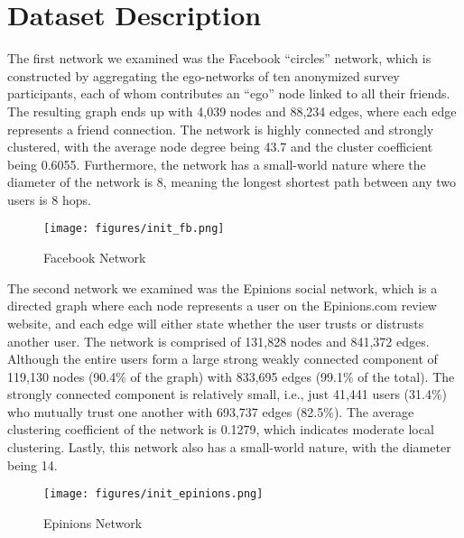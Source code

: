 \section{Dataset Description}

The first network we examined was the Facebook “circles” network, which is constructed by aggregating the ego-networks of ten anonymized survey participants, each of whom contributes an “ego” node linked to all their friends. The resulting graph ends up with 4,039 nodes and 88,234 edges, where each edge represents a friend connection. The network is highly connected and strongly clustered, with the average node degree being 43.7 and the cluster coefficient being 0.6055. Furthermore, the network has a small-world nature where the diameter of the network is 8, meaning the longest shortest path between any two users is 8 hops. 

\begin{figure}[ht]
    \centering
    \texttt{[image: figures/init\_fb.png]}
    \caption{Facebook Network}
    \label{fig:enter-label}
\end{figure}

The second network we examined was the Epinions social network, which is a directed graph where each node represents a user on the Epinions.com review website, and each edge will either state whether the user trusts or distrusts another user. The network is comprised of 131,828 nodes and 841,372 edges. Although the entire users form a large strong weakly connected component of 119,130 nodes (90.4\% of the graph) with 833,695 edges (99.1\% of the total). The strongly connected component is relatively small, i.e., just 41,441 users (31.4\%) who mutually trust one another with 693,737 edges (82.5\%). The average clustering coefficient of the network is 0.1279, which indicates moderate local clustering. Lastly, this network also has a small-world nature, with the diameter being 14. 

\begin{figure}[ht]
    \centering
    \texttt{[image: figures/init\_epinions.png]}
    \caption{Epinions Network}
    \label{fig:enter-label}
\end{figure}
